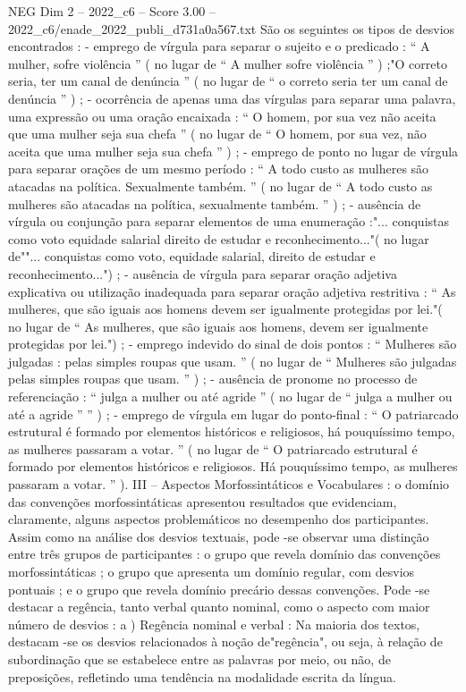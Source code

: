 \begin{textsample}{NEG Dim 2 – 2022\_c6 – Score 3.00 – 2022\_c6/enade\_2022\_publi\_d731a0a567.txt}
São os seguintes os tipos de desvios encontrados : - emprego de vírgula para separar o sujeito e o predicado : “ A mulher, sofre violência ” ( no lugar de “ A mulher sofre violência ” ) ;"O correto seria, ter um canal de denúncia ” ( no lugar de “ o correto seria ter um canal de denúncia ” ) ; - ocorrência de apenas uma das vírgulas para separar uma palavra, uma expressão ou uma oração encaixada : “ O homem, por sua vez não aceita que uma mulher seja sua chefa ” ( no lugar de “ O homem, por sua vez, não aceita que uma mulher seja sua chefa ” ) ; - emprego de ponto no lugar de vírgula para separar orações de um mesmo período : “ A todo custo as mulheres são atacadas na política.
Sexualmente também. ” ( no lugar de “ A todo custo as mulheres são atacadas na política, sexualmente também. ” ) ; - ausência de vírgula ou conjunção para separar elementos de uma enumeração :"... conquistas como voto equidade salarial direito de estudar e reconhecimento..."( no lugar de""... conquistas como voto, equidade salarial, direito de estudar e reconhecimento...") ; - ausência de vírgula para separar oração adjetiva explicativa ou utilização inadequada para separar oração adjetiva restritiva : “ As mulheres, que são iguais aos homens devem ser igualmente protegidas por lei."( no lugar de “ As mulheres, que são iguais aos homens, devem ser igualmente protegidas por lei.") ; - emprego indevido do sinal de dois pontos : “ Mulheres são julgadas : pelas simples roupas que usam. ” ( no lugar de “ Mulheres são julgadas pelas simples roupas que usam. ” ) ; - ausência de pronome no processo de referenciação : “ julga a mulher ou até agride ” ( no lugar de “ julga a mulher ou até a agride ” ” ) ; - emprego de vírgula em lugar do ponto-final : “ O patriarcado estrutural é formado por elementos históricos e religiosos, há pouquíssimo tempo, as mulheres passaram a votar. ” ( no lugar de “ O patriarcado estrutural é formado por elementos históricos e religiosos.
Há pouquíssimo tempo, as mulheres passaram a votar. ” ).
III – Aspectos Morfossintáticos e Vocabulares : o domínio das convenções morfossintáticas apresentou resultados que evidenciam, claramente, alguns aspectos problemáticos no desempenho dos participantes.
Assim como na análise dos desvios textuais, pode -se observar uma distinção entre três grupos de participantes : o grupo que revela domínio das convenções morfossintáticas ; o grupo que apresenta um domínio regular, com desvios pontuais ; e o grupo que revela domínio precário dessas convenções.
Pode -se destacar a regência, tanto verbal quanto nominal, como o aspecto com maior número de desvios : a ) Regência nominal e verbal : Na maioria dos textos, destacam -se os desvios relacionados à noção de"regência", ou seja, à relação de subordinação que se estabelece entre as palavras por meio, ou não, de preposições, refletindo uma tendência na modalidade escrita da língua.

\end{textsample}

